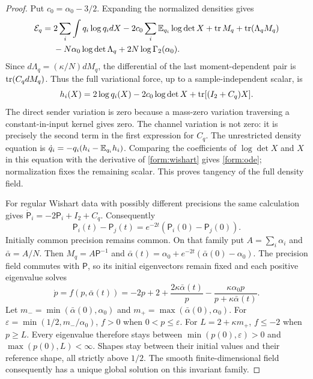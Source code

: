 \begin{proof}
Put $c_0=\alpha_0-3/2$. Expanding the normalized densities gives
\begin{align}
 \mathcal E_q={}&2\sum_i\int q_i\log q_idX
 -2c_0\sum_i\mathbb E_{q_i}\log\det X+\operatorname{tr} M_q
 +\operatorname{tr}(\Lambda_qM_q)\notag\\
 &-N\alpha_0\log\det\Lambda_q+2N\log\Gamma_2(\alpha_0).
 \label{form:expanded-energy}
\end{align}
Since $d\Lambda_q=(\kappa/N)dM_q$, the differential of the last
moment-dependent pair is $\operatorname{tr}(C_qdM_q)$. Thus the full variational force,
up to a sample-independent scalar, is
\begin{equation}
 h_i(X)=2\log q_i(X)-2c_0\log\det X+\operatorname{tr}[(I_2+C_q)X].
 \label{form:density-force}
\end{equation}
The direct sender variation is zero because a mass-zero variation traversing
a constant-in-input kernel gives zero. The channel variation is not zero:
it is precisely the second term in the first expression for $C_q$.
The unrestricted density equation is
$\dot q_i=-q_i(h_i-\mathbb E_{q_i}h_i)$.
Comparing the coefficients of $\log\det X$ and $X$ in this equation with
the derivative of \cref{form:wishart} gives \cref{form:ode}; normalization
fixes the remaining scalar. This proves tangency of the full density field.

For regular Wishart data with possibly different precisions the same calculation
gives $\dot{\mathsf P}_i=-2\mathsf P_i+I_2+C_q$.
Consequently
\begin{equation}
 \mathsf P_i(t)-\mathsf P_j(t)
 =e^{-2t}(\mathsf P_i(0)-\mathsf P_j(0)).
 \label{form:precision-difference}
\end{equation}
Initially common precision remains common. On that family put
$A=\sum_i\alpha_i$ and $\bar\alpha=A/N$. Then
$M_q=A\mathsf P^{-1}$ and
$\bar\alpha(t)=\alpha_0+e^{-2t}(\bar\alpha(0)-\alpha_0)$.
The precision field commutes with $\mathsf P$, so its initial eigenvectors
remain fixed and each positive eigenvalue solves
\begin{equation}
 \dot p=f(p,\bar\alpha(t))
 =-2p+2+\frac{2\kappa\bar\alpha(t)}p
       -\frac{\kappa\alpha_0p}{p+\kappa\bar\alpha(t)}.
 \label{form:eigenvalue}
\end{equation}
Let $m_-=\min(\bar\alpha(0),\alpha_0)$ and
$m_+=\max(\bar\alpha(0),\alpha_0)$. For
$\varepsilon=\min(1/2,m_-/\alpha_0)$, $f>0$ when $0<p\le\varepsilon$.
For $L=2+\kappa m_+$, $f\le-2$ when $p\ge L$.
Every eigenvalue therefore stays between
$\min(p(0),\varepsilon)>0$ and $\max(p(0),L)<\infty$.
Shapes stay between their initial values and their reference shape, all
strictly above $1/2$. The smooth finite-dimensional field consequently has
a unique global solution on this invariant family.


\end{proof}
